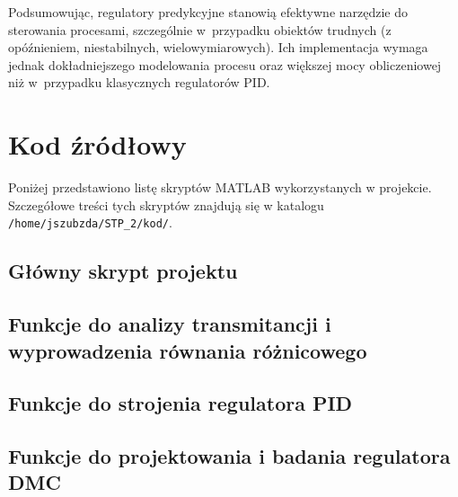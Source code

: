 \documentclass[a4paper,titlepage,11pt,floatssmall]{mwrep}
\begin{document}
Podsumowując, regulatory predykcyjne stanowią efektywne narzędzie do sterowania procesami, szczególnie w~przypadku obiektów trudnych (z opóźnieniem, niestabilnych, wielowymiarowych). Ich implementacja wymaga jednak dokładniejszego modelowania procesu oraz większej mocy obliczeniowej niż w~przypadku klasycznych regulatorów PID.

\chapter{Kod źródłowy}

Poniżej przedstawiono listę skryptów MATLAB wykorzystanych w projekcie. Szczegółowe treści tych skryptów znajdują się w katalogu \texttt{/home/jszubzda/STP\_2/kod/}.

\section{Główny skrypt projektu}



\section{Funkcje do analizy transmitancji i wyprowadzenia równania różnicowego}





\section{Funkcje do strojenia regulatora PID}



\section{Funkcje do projektowania i badania regulatora DMC}


\end{document}
